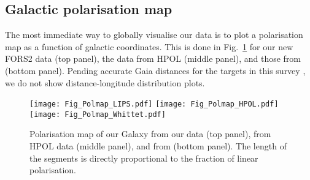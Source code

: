 \documentclass[a4paper]{aa}
\begin{document}
\subsection{Galactic polarisation map}
The most immediate way to globally visualise our data is to plot a
polarisation map as a function of galactic coordinates. This is done in
Fig.~\ref{Fig_Polmap} for our new FORS2 data (top panel), the data
from HPOL (middle panel), and those from \citet{Whietal92} (bottom
panel). Pending accurate Gaia distances for the targets in this survey
\citep{GaiaPrusti}, we do not show distance-longitude distribution plots.

\begin{figure}
  \texttt{[image: Fig\_Polmap\_LIPS.pdf]}
  \texttt{[image: Fig\_Polmap\_HPOL.pdf]}
  \texttt{[image: Fig\_Polmap\_Whittet.pdf]}
  \caption{\label{Fig_Polmap} Polarisation map of our Galaxy from our data
    (top panel), from HPOL data (middle panel), and from \citet{Whietal92} (bottom panel). The
  length of the segments is directly proportional to the fraction of linear polarisation.}
\end{figure}
\end{document}
